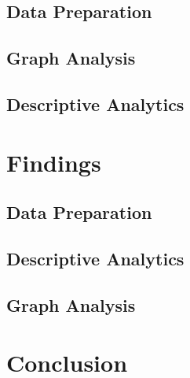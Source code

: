 \documentclass[conference]{IEEEtran}
\begin{document}
\subsection{Data Preparation}


\subsection{Graph Analysis}


\subsection{Descriptive Analytics}


\section{Findings}

\subsection{Data Preparation}


\subsection{Descriptive Analytics}


\subsection{Graph Analysis}


\section{Conclusion}


\newpage


\end{document}
